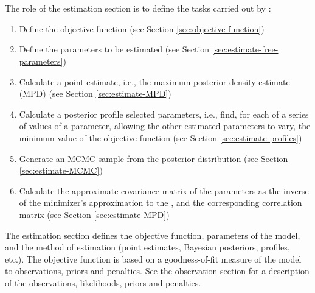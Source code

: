 \section{\label{sec:estimation-section}}

\subsection{\label{sec:role-of-the-estimation-section}}
The role of the estimation section is to define the tasks carried out by \CNAME: 

\begin{enumerate}
  \item Define the objective function (see Section \ref{sec:objective-function})
  \item Define the parameters to be estimated (see Section \ref{sec:estimate-free-parameters})
  \item Calculate a point estimate, i.e., the maximum posterior density estimate (MPD) (see Section \ref{sec:estimate-MPD})
  \item Calculate a posterior profile selected parameters, i.e., find, for each of a series of values of a parameter, allowing the other estimated parameters to vary, the minimum value of the objective function (see Section \ref{sec:estimate-profiles})
  \item Generate an MCMC sample from the posterior distribution (see Section \ref{sec:estimate-MCMC})
  \item Calculate the approximate covariance matrix of the parameters as the inverse of the minimizer\textquoteright{}s approximation to the , and the corresponding correlation matrix (see Section \ref{sec:estimate-MPD})
\end{enumerate}

The estimation section defines the objective function, parameters of the model, and the method of estimation (point estimates, Bayesian posteriors, profiles, etc.). The objective function is based on a goodness-of-fit measure of the model to observations, priors and penalties. See the observation section for a description of the observations, likelihoods, priors and penalties. 

\subsection{\label{sec:objective-function}}

